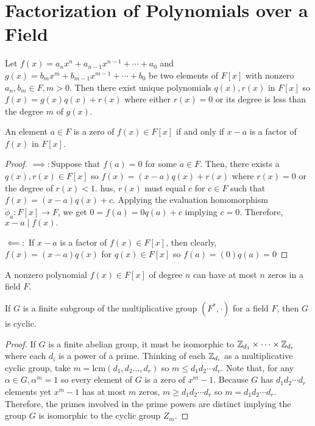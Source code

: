 \section{Factorization of Polynomials over a Field}

\begin{theorem}
    Let $f(x) = a_nx^n + a_{n-1}x^{n-1} + \cdots + a_0$ and $g(x) = b_mx^m + b_{m-1}x^{m-1} + \cdots + b_0$ be two elements of $F[x]$ with nonzero $a_n, b_m \in F, m > 0.$ Then there exist unique polynomials $q(x), r(x)$ in $F[x]$ so $f(x) = g(x)q(x) + r(x)$ where either $r(x) = 0$ or its degree is less than the degree $m$ of $g(x)$.
\end{theorem}
\begin{theorem}
    An element $a \in F$ is a zero of $f(x) \in F[x]$ if and only if $x-a$ is a factor of $f(x)$ in $F[x].$
\end{theorem}
\begin{proof}
    $\implies\colon$Suppose that $f(a) = 0$ for some $a \in F$. Then, there exists a $q(x), r(x) \in F[x]$ so $f(x) = (x-a)q(x) + r(x)$ where $r(x) = 0$ or the degree of $r(x) < 1.$ hus, $r(x)$ must equal $c$ for $c \in F$ such that $f(x) = (x-a)q(x)+c$. Applying the evaluation homomorphism $\phi_a\colon F[x]\to F$, we get $0 = f(a) = 0q(a)+c$ implying $c=0$. Therefore, $x-a \mid f(x).$
    
    $\impliedby\colon$ If $x-a$ is a factor of $f(x) \in F[x]$, then clearly, $f(x) = (x-a)q(x)$ for $q(x) \in F[x]$ so $f(a) = (0)q(a) = 0$
\end{proof}
\begin{corollary}
    A nonzero polynomial $f(x) \in F[x]$ of degree $n$ can have at most $n$ zeros in a field $F$.
\end{corollary}
\begin{corollary}
    If $G$ is a finite subgroup of the multiplicative group $(F^*,\cdot)$ for a field $F$, then $G$ is cyclic.
\end{corollary}
\begin{proof}
    If $G$ is a finite abelian group, it must be isomorphic to $\mathbb{Z}_{d_1}\times\cdots\times\mathbb{Z}_{d_r}$ where each $d_i$ is a power of a prime. Thinking of each $\mathbb{Z}_{d_i}$ as a multiplicative cyclic group, take $m = \text{lcm}(d_1,d_2\ldots,d_r)$ so $m \leq d_1d_2\cdots d_r$. Note that, for any $\alpha \in G, \alpha^m = 1$ so every element of $G$ is a zero of $x^m-1$. Because $G$ has $d_1d_2\cdots d_r$ elements yet $x^m-1$ has at most $m$ zeros, $m \geq d_1d_2\cdots d_r$ so $m = d_1d_2\cdots d_r$. Therefore, the primes involved in the prime powers are distinct implying the group $G$ is isomorphic to the cyclic group $Z_m$.
\end{proof}

